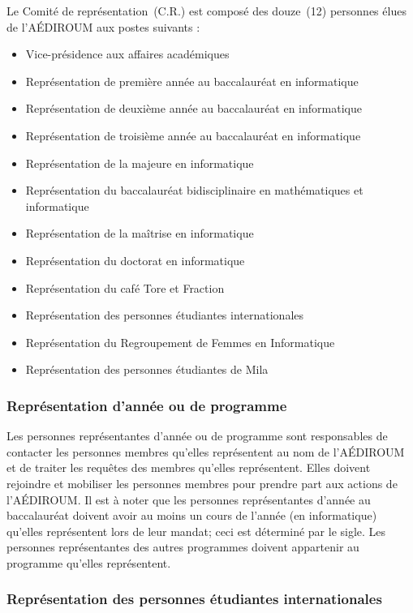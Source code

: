 \documentclass{aediroum}
\begin{document}
Le Comité de représentation~(C.R.) est composé des douze~(12) personnes élues de
l’AÉDIROUM aux postes suivants :
\begin{itemize}
\item Vice-présidence aux affaires académiques
\item Représentation de première année au baccalauréat en informatique
\item Représentation de deuxième année au baccalauréat en informatique
\item Représentation de troisième année au baccalauréat en informatique
\item Représentation de la majeure en informatique
\item Représentation du baccalauréat bidisciplinaire en mathématiques et informatique
\item Représentation de la maîtrise en informatique
\item Représentation du doctorat en informatique
\item Représentation du café Tore et Fraction
\item Représentation des personnes étudiantes internationales
\item Représentation du Regroupement de Femmes en Informatique
\item Représentation des personnes étudiantes de Mila
\end{itemize}

\subsubsection{Représentation d'année ou de programme}\label{sec:representant-dannee-ou-de-programme}

Les personnes représentantes d'année ou de programme sont responsables de contacter les personnes membres qu'elles représentent au nom de l'AÉDIROUM et de traiter les requêtes des membres qu'elles représentent. Elles doivent rejoindre et mobiliser les personnes membres pour prendre part aux actions de l'AÉDIROUM. Il est à noter que les personnes représentantes d'année au baccalauréat doivent avoir au moins un cours de l'année (en informatique) qu'elles représentent lors de leur mandat; ceci est déterminé par le sigle. Les personnes représentantes des autres programmes doivent appartenir au programme qu'elles représentent.

\subsubsection{Représentation des personnes étudiantes internationales}\label{sec:representant-des-etudiants-internationaux}
\end{document}
